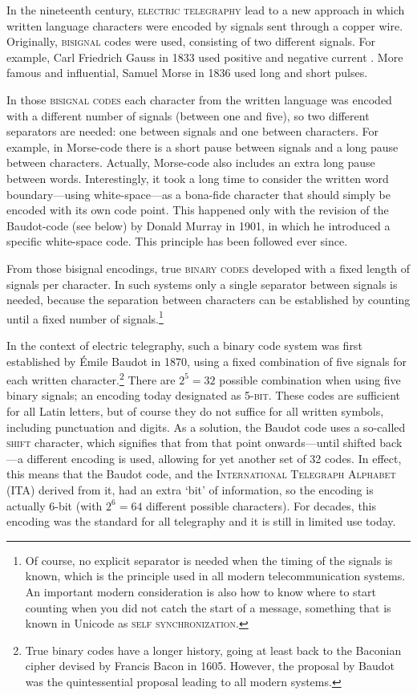 In the nineteenth century, \textsc{electric telegraphy} lead to a new approach in which written language characters were encoded by signals sent through a copper wire. Originally, \textsc{bisignal} codes were used, consisting of two different signals. For example, Carl Friedrich Gauss in 1833 used positive and negative current \citep[282]{Mania2008}. More famous and influential, Samuel Morse in 1836 used long and short pulses. 

In those \textsc{bisignal codes} each character from the written language was encoded with a different number of signals (between one and five), so two different separators are needed: one between signals and one between characters. For example, in Morse-code there is a short pause between signals and a long pause between characters. Actually, Morse-code also includes an extra long pause between words. Interestingly, it took a long time to consider the written word boundary---using white-space---as a bona-fide character that should simply be encoded with its own code point. This happened only with the revision of the Baudot-code (see below) by Donald Murray in 1901, in which he introduced a specific white-space code. This principle has been followed ever since.

From those bisignal encodings, true \textsc{binary codes} developed with a fixed length of signals per character. In such systems only a single separator between signals is needed, because the separation between characters can be established by counting until a fixed number of signals.\footnote{Of course, no explicit separator is needed when the timing of the signals is known, which is the principle used in all modern telecommunication systems. An important modern consideration is also how to know where to start counting when you did not catch the start of a message, something that is known in Unicode as \textsc{self synchronization}.} 

In the context of electric telegraphy, such a binary code system was first established by Émile Baudot in 1870, using a fixed combination of five signals for each written character.\footnote{True binary codes have a longer history, going at least back to the Baconian cipher devised by Francis Bacon in 1605. However, the proposal by Baudot was the quintessential proposal leading to all modern systems.} There are $2^5 = 32$ possible combination when using five binary signals; an encoding today designated as \textsc{5-bit}. These codes are sufficient for all Latin letters, but of course they do not suffice for all written symbols, including punctuation and digits. As a solution, the Baudot code uses a so-called \textsc{shift} character, which signifies that from that point onwards---until shifted back---a different encoding is used, allowing for yet another set of 32 codes. In effect, this means that the Baudot code, and the \textsc{International Telegraph Alphabet} (ITA) derived from it, had an extra `bit' of information, so the encoding is actually 6-bit (with $2^6 = 64$ different possible characters). For decades, this encoding was the standard for all telegraphy and it is still in limited use today.

